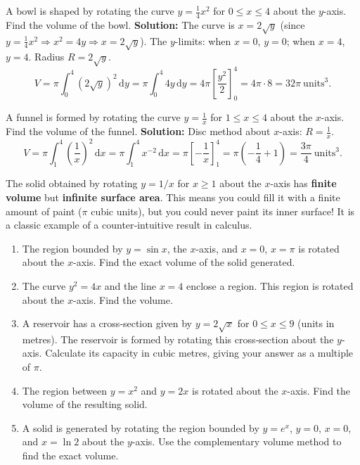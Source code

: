 \documentclass[11pt]{article}
\newcounter{popsec}
\newcounter{popsub}
\newcommand{\courssub}[1]{%
  \stepcounter{popsub}%
  \par\vspace{9pt}\noindent{\popxbold\fontsize{11.5}{13}\selectfont\color{popink}{\color{poporange}\thepopsec.\thepopsub}\hspace{6pt}#1}\par\nopagebreak\vspace{4pt}
}
\begin{document}
\begin{exoresolu}
A bowl is shaped by rotating the curve $y = \frac{1}{4}x^2$ for $0 \le x \le 4$ about the $y$-axis. Find the volume of the bowl.
\tcblower
\textbf{Solution:}
The curve is $x = 2\sqrt{y}$ (since $y = \frac{1}{4}x^2 \Rightarrow x^2 = 4y \Rightarrow x = 2\sqrt{y}$). The $y$-limits: when $x=0$, $y=0$; when $x=4$, $y=4$. Radius $R = 2\sqrt{y}$.
\[
V = \pi \int_0^4 (2\sqrt{y})^2\,\mathrm{d}y = \pi \int_0^4 4y\,\mathrm{d}y = 4\pi \left[ \frac{y^2}{2} \right]_0^4 = 4\pi \cdot 8 = 32\pi\ \mathrm{units}^3.
\]
\end{exoresolu}

\begin{exoresolu}
A funnel is formed by rotating the curve $y = \frac{1}{x}$ for $1 \le x \le 4$ about the $x$-axis. Find the volume of the funnel.
\tcblower
\textbf{Solution:}
Disc method about $x$-axis: $R = \frac{1}{x}$.
\[
V = \pi \int_1^4 \left(\frac{1}{x}\right)^2\,\mathrm{d}x = \pi \int_1^4 x^{-2}\,\mathrm{d}x = \pi \left[ -\frac{1}{x} \right]_1^4 = \pi \left( -\frac{1}{4} + 1 \right) = \frac{3\pi}{4}\ \mathrm{units}^3.
\]
\end{exoresolu}

\begin{savaistu}
The solid obtained by rotating $y = 1/x$ for $x \ge 1$ about the $x$-axis has \textbf{finite volume} but \textbf{infinite surface area}. This means you could fill it with a finite amount of paint ($\pi$ cubic units), but you could never paint its inner surface! It is a classic example of a counter‑intuitive result in calculus.
\end{savaistu}

\courssub{Examination-Style Practice}

\begin{exercice}
\begin{enumerate}
\item The region bounded by $y = \sin x$, the $x$-axis, and $x = 0$, $x = \pi$ is rotated about the $x$-axis. Find the exact volume of the solid generated.
\item The curve $y^2 = 4x$ and the line $x = 4$ enclose a region. This region is rotated about the $x$-axis. Find the volume.
\item A reservoir has a cross‑section given by $y = 2\sqrt{x}$ for $0 \le x \le 9$ (units in metres). The reservoir is formed by rotating this cross‑section about the $y$-axis. Calculate its capacity in cubic metres, giving your answer as a multiple of $\pi$.
\item The region between $y = x^2$ and $y = 2x$ is rotated about the $x$-axis. Find the volume of the resulting solid.
\item A solid is generated by rotating the region bounded by $y = e^x$, $y = 0$, $x = 0$, and $x = \ln 2$ about the $y$-axis. Use the complementary volume method to find the exact volume.
\end{enumerate}
\end{exercice}
\end{document}
